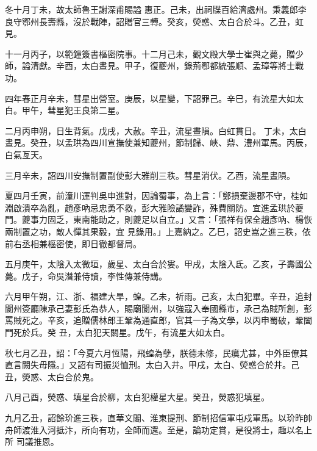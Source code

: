 \begin{pinyinscope}
 冬十月丁未，故太師魯王謝深甫賜謚
 惠正。己未，出祠牒百給濟處州。秉義郎李良守鄂州長壽縣，沒於戰陣，詔贈官三轉。癸亥，熒惑、太白合於斗。乙丑，虹見。



 十一月丙子，以範鐘簽書樞密院事。十二月己未，觀文殿大學士崔與之薨，贈少師，謚清獻。辛酉，太白晝見。甲子，復夔州，錄荊鄂都統張順、孟璋等將士戰功。



 四年春正月辛未，彗星出營室。庚辰，以星變，下詔罪己。辛巳，有流星大如太白。甲午，彗星犯王良第二星。



 二月丙申朔，日生背氣。戊戌，大赦。辛丑，流星晝隕。白虹貫日。
 丁未，太白晝見。癸丑，以孟珙為四川宣撫使兼知夔州，節制歸、峽、鼎、澧州軍馬。丙辰，白氣亙天。



 三月辛未，詔四川安撫制置副使彭大雅削三秩。彗星消伏。乙酉，流星晝隕。



 夏四月壬寅，前潼川運判吳申進對，因論蜀事，為上言：「鄭損棄邊郡不守，桂如淵啟潰卒為亂，趙彥吶忌忠勇不救，彭大雅險譎變詐，殊費關防。宜進孟珙於夔門。夔事力固乏，東南能助之，則夔足以自立。」又言：「張祥有保全趙彥吶、楊恢兩制置之功，敵人憚其果毅，宜
 見錄用。」上嘉納之。乙巳，詔史嵩之進三秩，依前右丞相兼樞密使，即日徹都督局。



 五月庚午，太陰入太微垣，歲星、太白合於婁。甲戌，太陰入氐。乙亥，子壽國公薨。戊子，命吳潛兼侍讀，李性傳兼侍講。



 六月甲午朔，江、浙、福建大旱，蝗。乙未，祈雨。己亥，太白犯畢。辛丑，追封閬州簽廳陳承己妻彭氏為恭人，賜廟閬州，以強寇入奉國縣市，承己為賊所創，彭罵賊死之。辛亥，追贈儒林郎王鞏為通直郎，官其一子為文學，以丙申蜀破，鞏闔門死於兵。癸
 丑，太白犯天關星。戊午，有流星大如太白。



 秋七月乙丑，詔：「今夏六月恆陽，飛蝗為孽，朕德未修，民瘼尤甚，中外臣僚其直言闕失毋隱。」又詔有司振災恤刑。太白入井。甲戌，太白、熒惑合於井。己丑，熒惑、太白合於鬼。



 八月己酉，熒惑、填星合於柳，太白犯權星大星。癸丑，熒惑犯填星。



 九月乙丑，詔餘玠進三秩，直華文閣、淮東提刑、節制招信軍屯戍軍馬。以玠昨帥舟師渡淮入河抵汴，所向有功，全師而還。至是，論功定賞，是役將士，趣以名上所
 司議推恩。




\end{pinyinscope}

